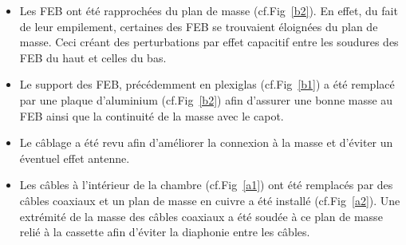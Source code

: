 \begin{itemize}[label=$\bullet$]
	\item Les FEB ont été rapprochées du plan de masse (cf.Fig~\ref{b2}). En effet, du fait de leur empilement, certaines des FEB se trouvaient éloignées du plan de masse. Ceci créant des perturbations par effet capacitif entre les soudures des FEB du haut et celles du bas.
	\item Le support des FEB, précédemment en plexiglas (cf.Fig~\ref{b1}) a été remplacé par une plaque d'aluminium (cf.Fig~\ref{b2}) afin d'assurer une bonne masse au FEB ainsi que la continuité de la masse avec le capot.
	\item Le câblage a été revu afin d'améliorer la connexion à la masse et d'éviter un éventuel effet antenne.
	\item Les câbles à l'intérieur de la chambre (cf.Fig~\ref{a1}) ont été remplacés par des câbles coaxiaux et un plan de masse en cuivre a été installé (cf.Fig~\ref{a2}). Une extrémité de la masse des câbles coaxiaux a été soudée à ce plan de masse relié à la cassette afin d'éviter la diaphonie entre les câbles.
\end{itemize}


